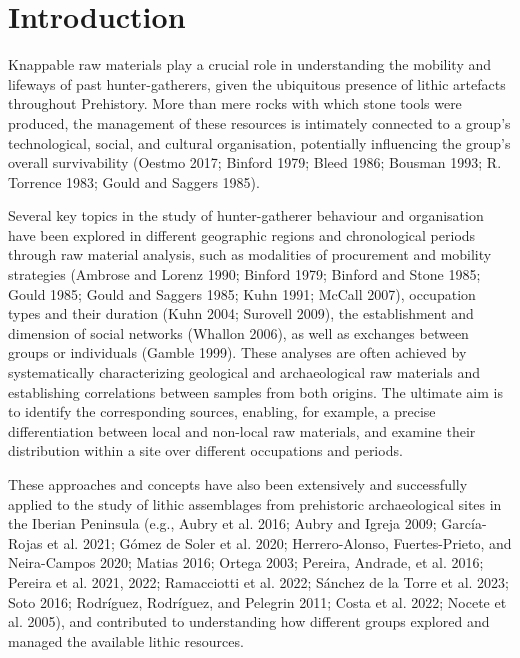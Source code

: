 \documentclass[
  a4paper,
  DIV=11,
  numbers=noendperiod]{scrreprt}
\begin{document}
\section{Introduction}\label{introduction-2}

Knappable raw materials play a crucial role in understanding the
mobility and lifeways of past hunter-gatherers, given the ubiquitous
presence of lithic artefacts throughout Prehistory. More than mere rocks
with which stone tools were produced, the management of these resources
is intimately connected to a group's technological, social, and cultural
organisation, potentially influencing the group's overall survivability
(Oestmo 2017; Binford 1979; Bleed 1986; Bousman 1993; R. Torrence 1983;
Gould and Saggers 1985).

Several key topics in the study of hunter-gatherer behaviour and
organisation have been explored in different geographic regions and
chronological periods through raw material analysis, such as modalities
of procurement and mobility strategies (Ambrose and Lorenz 1990; Binford
1979; Binford and Stone 1985; Gould 1985; Gould and Saggers 1985; Kuhn
1991; McCall 2007), occupation types and their duration (Kuhn 2004;
Surovell 2009), the establishment and dimension of social networks
(Whallon 2006), as well as exchanges between groups or individuals
(Gamble 1999). These analyses are often achieved by systematically
characterizing geological and archaeological raw materials and
establishing correlations between samples from both origins. The
ultimate aim is to identify the corresponding sources, enabling, for
example, a precise differentiation between local and non-local raw
materials, and examine their distribution within a site over different
occupations and periods.

These approaches and concepts have also been extensively and
successfully applied to the study of lithic assemblages from prehistoric
archaeological sites in the Iberian Peninsula (e.g., Aubry et al. 2016;
Aubry and Igreja 2009; García-Rojas et al. 2021; Gómez de Soler et al.
2020; Herrero-Alonso, Fuertes-Prieto, and Neira-Campos 2020; Matias
2016; Ortega 2003; Pereira, Andrade, et al. 2016; Pereira et al. 2021,
2022; Ramacciotti et al. 2022; Sánchez de la Torre et al. 2023; Soto
2016; Rodríguez, Rodríguez, and Pelegrin 2011; Costa et al. 2022; Nocete
et al. 2005), and contributed to understanding how different groups
explored and managed the available lithic resources.
\end{document}
